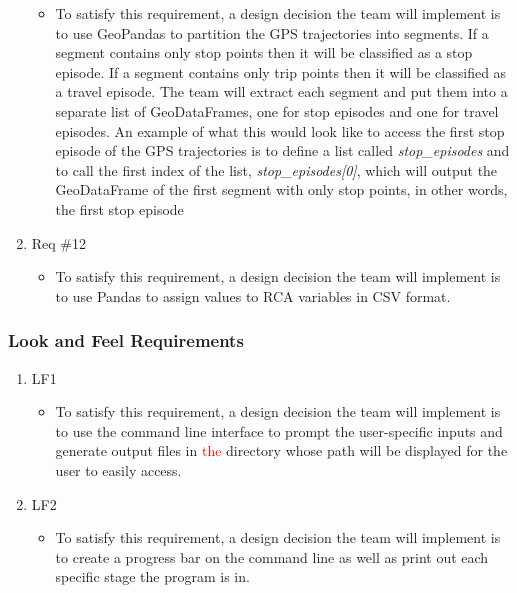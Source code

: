 \documentclass[12pt, titlepage]{article}
\begin{document}
\begin{enumerate}
\begin{itemize}
        \item To satisfy this requirement, a design decision the team will implement is to use GeoPandas to partition the GPS trajectories into segments. If a segment contains only stop points then it will be classified as a stop episode. If a segment contains only trip points then it will be classified as a travel episode. The team will extract each segment and put them into a separate list of GeoDataFrames, one for stop episodes and one for travel episodes. An example of what this would look like to access the first stop episode of the GPS trajectories is to define a list called \emph{stop\_episodes} and to call the first index of the list, \emph{stop\_episodes[0]}, which will output the GeoDataFrame of the first segment with only stop points, in other words, the first stop episode
    \end{itemize}
    \item Req \#12
    \begin{itemize}
        \item To satisfy this requirement, a design decision the team will implement is to use Pandas to assign values to RCA variables in CSV format.
    \end{itemize}
\end{enumerate}

\subsubsection{Look and Feel Requirements}

\begin{enumerate}
    \item LF1
    \begin{itemize}
        \item To satisfy this requirement, a design decision the team will implement is to use the command line interface to prompt the user-specific inputs and generate output files in \textcolor{red}{the} directory whose path will be displayed for the user to easily access.
    \end{itemize}
    \item LF2
    \begin{itemize}
        \item To satisfy this requirement, a design decision the team will implement is to create a progress bar on the command line as well as print out each specific stage the program is in.
    \end{itemize}
\end{enumerate}
\end{document}
